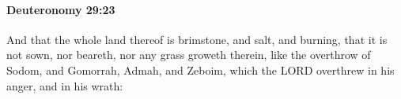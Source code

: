 
		\paragraph{Deuteronomy 29:23} %
			\label{DEUTERONOMY-29-23}

			And that the whole land thereof is brimstone, and salt, and burning, that it is not sown, nor beareth, nor any grass groweth therein, like the overthrow of Sodom, and Gomorrah, Admah, and Zeboim, which the LORD overthrew in his anger, and in his wrath:


